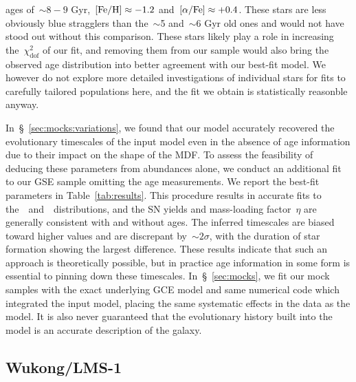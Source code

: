 \documentclass[ms.tex]{subfiles}
\begin{document}
ages of~$\sim$$8 - 9$ Gyr,~$\text{[Fe/H]} \approx -1.2$ and~$\text{[$\alpha$/Fe]} \approx +0.4$.
These stars are less obviously blue stragglers than the~$\sim$5 and~$\sim$6 Gyr
old ones and would not have stood out without this comparison.
These stars likely play a role in increasing the~$\chi_\text{dof}^2$ of our
fit, and removing them from our sample would also bring the observed age
distribution into better agreement with our best-fit model.
We however do not explore more detailed investigations of individual stars for
fits to carefully tailored populations here, and the fit we obtain is
statistically reasonble anyway.
\par
In~\S~\ref{sec:mocks:variations}, we found that our model accurately recovered
the evolutionary timescales of the input model even in the absence of age
information due to their impact on the shape of the MDF.
To assess the feasibility of deducing these parameters from abundances alone,
we conduct an additional fit to our GSE sample omitting the age measurements.
We report the best-fit parameters in Table~\ref{tab:results}.
This procedure results in accurate fits to the~\feh~and~\afe~distributions, and
the SN yields and mass-loading factor~$\eta$ are generally consistent with
and without ages.
The inferred timescales are biased toward higher values and are discrepant
by~$\sim$$2\sigma$, with the duration of star formation showing the largest
difference.
These results indicate that such an approach is theoretically possible, but in
practice age information in some form is essential to pinning down these
timescales.
In~\S~\ref{sec:mocks}, we fit our mock samples with the exact underlying GCE
model and same numerical code which integrated the input model, placing the
same systematic effects in the data as the model.
It is also never guaranteed that the evolutionary history built into the model
is an accurate description of the galaxy.

\subsection{Wukong/LMS-1}
\label{sec:h3:wukong}
\end{document}
